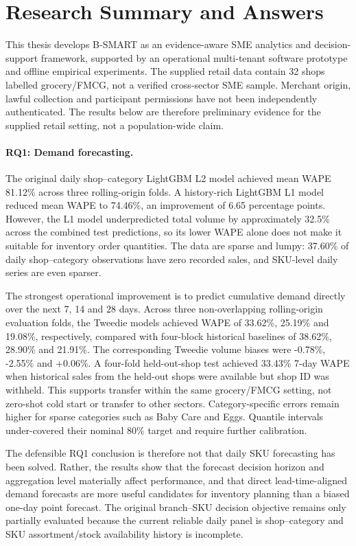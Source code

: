\section{Research Summary and Answers}

This thesis develops B-SMART as an evidence-aware SME analytics and decision-support framework, supported by an operational multi-tenant software prototype and offline empirical experiments. The supplied retail data contain 32 shops labelled grocery/FMCG, not a verified cross-sector SME sample. Merchant origin, lawful collection and participant permissions have not been independently authenticated. The results below are therefore preliminary evidence for the supplied retail setting, not a population-wide claim.

\paragraph{RQ1: Demand forecasting.}
The original daily shop--category LightGBM L2 model achieved mean WAPE 81.12\% across three rolling-origin folds. A history-rich LightGBM L1 model reduced mean WAPE to 74.46\%, an improvement of 6.65 percentage points. However, the L1 model underpredicted total volume by approximately 32.5\% across the combined test predictions, so its lower WAPE alone does not make it suitable for inventory order quantities. The data are sparse and lumpy: 37.60\% of daily shop--category observations have zero recorded sales, and SKU-level daily series are even sparser.

The strongest operational improvement is to predict cumulative demand directly over the next 7, 14 and 28 days. Across three non-overlapping rolling-origin evaluation folds, the Tweedie models achieved WAPE of 33.62\%, 25.19\% and 19.08\%, respectively, compared with four-block historical baselines of 38.62\%, 28.90\% and 21.91\%. The corresponding Tweedie volume biases were -0.78\%, -2.55\% and +0.06\%. A four-fold held-out-shop test achieved 33.43\% 7-day WAPE when historical sales from the held-out shops were available but shop ID was withheld. This supports transfer within the same grocery/FMCG setting, not zero-shot cold start or transfer to other sectors. Category-specific errors remain higher for sparse categories such as Baby Care and Eggs. Quantile intervals under-covered their nominal 80\% target and require further calibration.

The defensible RQ1 conclusion is therefore not that daily SKU forecasting has been solved. Rather, the results show that the forecast decision horizon and aggregation level materially affect performance, and that direct lead-time-aligned demand forecasts are more useful candidates for inventory planning than a biased one-day point forecast. The original branch--SKU decision objective remains only partially evaluated because the current reliable daily panel is shop--category and SKU assortment/stock availability history is incomplete.

